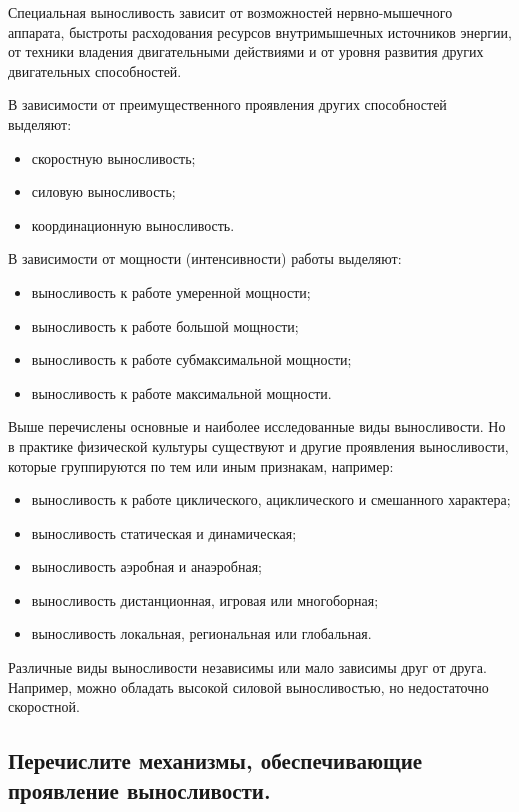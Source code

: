 Специальная выносливость зависит от возможностей нервно-мышечного аппарата, быстроты расходования ресурсов внутримышечных
источников энергии, от техники владения двигательными действиями и от уровня развития других двигательных способностей.

В зависимости от преимущественного проявления других способностей выделяют:
\begin{itemize}
    \item скоростную выносливость;
    \item силовую выносливость;
    \item координационную выносливость.
\end{itemize}

В зависимости от мощности (интенсивности) работы выделяют:
\begin{itemize}
    \item выносливость к работе умеренной мощности;
    \item выносливость к работе большой мощности;
    \item выносливость к работе субмаксимальной мощности;
    \item выносливость к работе максимальной мощности.
\end{itemize}

Выше перечислены основные и наиболее исследованные виды выносливости. Но в практике физической культуры существуют и
другие проявления выносливости, которые группируются по тем или иным признакам, например:
\begin{itemize}
    \item выносливость к работе циклического, ациклического и смешанного характера;
    \item выносливость статическая и динамическая;
    \item выносливость аэробная и анаэробная;
    \item выносливость дистанционная, игровая или многоборная;
    \item выносливость локальная, региональная или глобальная.
\end{itemize}

Различные виды выносливости независимы или мало зависимы друг от друга. Например, можно обладать высокой силовой выносливостью,
но недостаточно скоростной.


\subsection{Перечислите механизмы, обеспечивающие проявление выносливости.}

